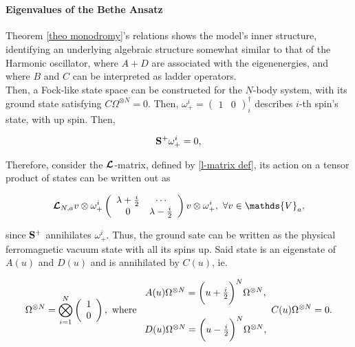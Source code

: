 \documentclass{homework}
\begin{document}
\blanky \\

\paragraph{\textbf{Eigenvalues of the Bethe Ansatz}}

Theorem \ref{theo monodromy}'s relations shows the model's inner structure, identifying an underlying algebraic structure somewhat similar to that of the Harmonic oscillator, where $A+D$ are associated with the eigenenergies, and where $B$ and $C$ can be interpreted as ladder operators. \\

Then, a Fock-like state space can be constructed for the $N$-body system, with its ground state satisfying $C \Omega^{\otimes N} = 0$. Then, $\omega_+^{i} = \left( \begin{array}{cc}
    1 & 0 
\end{array}\right)_{i}^{\dagger}$ describes $i$-th spin's state, with up spin. Then, 

$$
{\bf S}^{+} \omega_+^{i} = 0,
$$

Therefore, consider the $\bm{\mathcal{L}}$-matrix, defined by \eqref{l-matrix def}, its action on a tensor product of states can be written out as 

\begin{equation}
    \bl_{N, a} v \otimes \omega_+^{i} \left(\begin{array}{cc}
        \lambda + \frac{i}{2} & \cdots \\
        0 &  \lambda - \frac{i}{2}
    \end{array}\right) v \otimes \omega_+^{i}, \blanky \forall v \in \mathds{V}_a,
\end{equation}

since ${\bf S}^{+}$ annihilates $\omega_+^i$. Thus, the ground sate can be written as the physical ferromagnetic vacuum state with all its spins up. Said state is an eigenstate of $A(u)$ and $D(u)$ and is annihilated by $C(u)$, ie. 

\begin{align}
    \Omega^{\otimes N} = \bigotimes_{i=1}^{N} \left( \begin{array}{c} 
         1 \\
         0 
    \end{array} \right), \textnormal{ where } \begin{array}{c}
    A(u) \Omega^{\otimes N} = \bigg(u + \frac{i}{2}\bigg)^{N} \Omega^{\otimes N}, \\
    \\
    D(u) \Omega^{\otimes N} = \bigg(u - \frac{i}{2}\bigg)^{N} \Omega^{\otimes N}, \\
    \end{array}
    C(u) \Omega^{\otimes N} = 0. 
\end{align}
\end{document}
